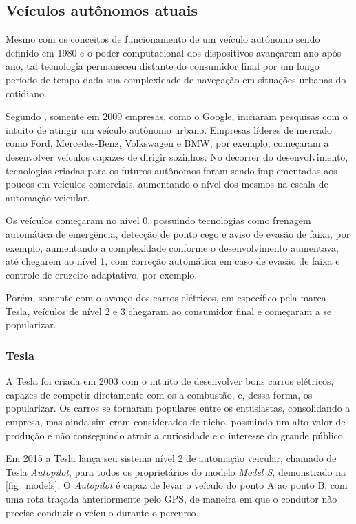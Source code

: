 \subsection{Ve{\'i}culos aut{\^o}nomos atuais}

Mesmo com os conceitos de funcionamento de um veículo autônomo sendo definido
em 1980 e o poder computacional dos dispositivos avançarem ano após ano, tal
tecnologia permaneceu distante do consumidor final por um longo período de
tempo dada sua complexidade de navegação em situações urbanas do cotidiano. 

Segundo , somente em 2009 empresas, como o Google, iniciaram
pesquisas com o intuito de atingir um veículo autônomo urbano. Empresas líderes
de mercado como Ford, Mercedes-Benz, Volkswagen e BMW, por exemplo, começaram a
desenvolver veículos capazes de dirigir sozinhos. No decorrer do
desenvolvimento, tecnologias criadas para os futuros autônomos foram sendo
implementadas aos poucos em veículos comerciais, aumentando o nível dos mesmos
na escala de automação veicular.

Os veículos começaram no nível 0, possuindo tecnologias como frenagem
automática de emergência, detecção de ponto cego e aviso de evasão de faixa,
por exemplo, aumentando a complexidade conforme o desenvolvimento aumentava,
até chegarem ao nível 1, com correção automática em caso de evasão de faixa e
controle de cruzeiro adaptativo, por exemplo.

Porém, somente com o avanço dos carros elétricos, em específico pela marca
Tesla, veículos de nível 2 e 3 chegaram ao consumidor final e começaram a se
popularizar.

\subsubsection{Tesla}

A Tesla foi criada em 2003 com o intuito de desenvolver bons carros elétricos,
capazes de competir diretamente com os a combustão, e, dessa forma, os
popularizar.  Os carros se tornaram populares entre os entusiastas,
consolidando a empresa, mas ainda sim eram considerados de nicho, possuindo um
alto valor de produção e não conseguindo atrair a curiosidade e o interesse do
grande público.

Em 2015 a Tesla lança seu sistema nível 2 de automação veicular, chamado de
Tesla \textit{Autopilot}, para todos os proprietários do modelo \textit{Model
S}, demonstrado na \autoref{fig_models}. O \textit{Autopilot} é capaz de levar
o veículo do ponto A ao ponto B, com uma rota traçada anteriormente pelo GPS,
de maneira em que o condutor não precise conduzir o veículo durante o percurso. 

